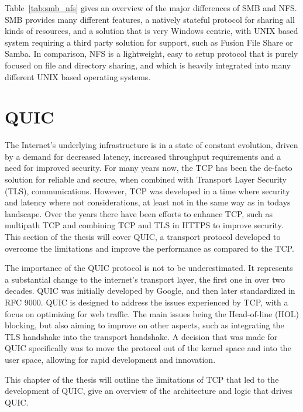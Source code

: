 \documentclass[english, 12pt, a4paper, elec, utf8, a-2b, online]{aaltothesis}
\begin{document}
Table~\ref{tab:smb_nfs} gives an overview of the major differences of SMB and
NFS. SMB provides many different features, a natively stateful protocol for sharing
all kinds of resources, and a solution that is very Windows centric, with UNIX based
system requiring a third party solution for support, such as Fusion File Share or
Samba. In comparison, NFS is a lightweight, easy to setup protocol that is purely
focused on file and directory sharing, and which is heavily integrated into many
different UNIX based operating systems.
\clearpage

\section{QUIC}
\label{sec:quic}
The Internet's underlying infrastructure is in a state of constant evolution,
driven by a demand for decreased latency, increased throughput requirements and
a need for improved security. For many years now, the TCP has been the de-facto
solution for reliable and secure, when combined with Transport Layer Security (TLS), communications. However,
TCP was developed in a time where security and latency where not considerations,
at least not in the same way as in todays landscape. Over the years there have
been efforts to enhance TCP, such as multipath TCP\cite{rfc8684} and combining
TCP and TLS in HTTPS\cite{rfc2818} to improve security. This section of the thesis
will cover QUIC, a transport protocol developed to overcome the limitations and
improve the performance as compared to the TCP\cite{quic_transport_protocol_design}.

The importance of the QUIC protocol is not to be underestimated. It represents
a substantial change to the internet's transport layer, the first one in over
two decades. QUIC was initially developed by Google, and then later standardized
in RFC 9000\cite{rfc9000}. QUIC is designed to address the issues experienced
by TCP, with a focus on optimizing for web traffic. The main issues being the
Head-of-line (HOL) blocking, but also aiming to improve on other aspects,
such as integrating the TLS handshake into the transport handshake. A decision
that was made for QUIC specifically was to move the protocol out of the kernel
space and into the user space, allowing for rapid development and innovation\cite{quic_transport_protocol_design}.

This chapter of the thesis will outline the limitations of TCP that led to the
development of QUIC, give an overview of the architecture and logic that drives
QUIC.
\end{document}
